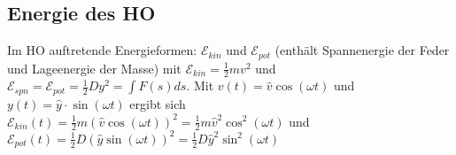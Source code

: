 \documentclass[a4paper]{scrartcl}
\begin{document}
\subsection{Energie des HO}
Im HO auftretende Energieformen: $\mathcal{E}_{kin}$ und $\mathcal{E}_{pot}$
(enthält Spannenergie der Feder und Lageenergie der Masse) mit
$\mathcal{E}_{kin} = \frac{1}{2}mv^2$ und $\mathcal{E}_{spn} =
\mathcal{E}_{pot} = \frac{1}{2}Dy^2 = \int F(s) ds$. Mit $v(t) = \hat{v}
\cos(\omega t)$ und $y(t) = \hat{y} \cdot \sin(\omega t)$ ergibt sich
$\mathcal{E}_{kin}(t) = \frac{1}{2} m (\hat{v} \cos(\omega t))^2 = \frac{1}{2}
m \hat{v}^2 \cos^2(\omega t)$ und $\mathcal{E}_{pot}(t) = \frac{1}{2} D
(\hat{y} \sin(\omega t))^2 = \frac{1}{2} D \hat{y}^2 \sin^2(\omega t)$
\end{document}
